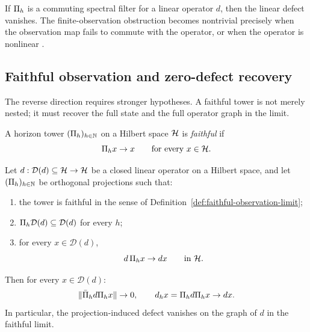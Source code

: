 \begin{remark}
\label{rem:commuting-filter-bridge}
If $\Pi_{h}$ is a commuting spectral filter for a linear operator $d$, then
the linear defect vanishes. The finite-observation obstruction becomes
nontrivial precisely when the observation map fails to commute with the
operator, or when the operator is nonlinear \cite{ReedSimon1972}.
\end{remark}

\subsection{Faithful observation and zero-defect recovery}

The reverse direction requires stronger hypotheses. A faithful tower is not
merely nested; it must recover the full state and the full operator graph in
the limit.

\begin{definition}
\label{def:faithful-observation-limit}
A horizon tower $(\Pi_{h})_{h\in\mathbb{N}}$ on a Hilbert space $\mathcal{H}$ is
\emph{faithful} if
\[
\Pi_{h}x\to x
\qquad\text{for every }x\in\mathcal{H}.
\]
\end{definition}

\begin{proposition}
\label{prop:faithful-operator-recovery}
Let $d:\mathcal D(d)\subseteq \mathcal{H}\to \mathcal{H}$ be a closed linear operator on a
Hilbert space, and let $(\Pi_{h})_{h\in\mathbb{N}}$ be orthogonal projections such
that:
\begin{enumerate}[label=(\roman*), leftmargin=2em, itemsep=0.2em]
\item the tower is faithful in the sense of
      Definition~\ref{def:faithful-observation-limit};
\item $\Pi_{h}\mathcal D(d)\subseteq \mathcal D(d)$ for every $h$;
\item for every $x\in\mathcal D(d)$,
      \[
      d\,\Pi_{h}x\to dx
      \qquad\text{in }\mathcal{H}.
      \]
\end{enumerate}
Then for every $x\in\mathcal D(d)$:
\[
\|\bar{\Pi}_{h}d\Pi_{h}x\|\to 0,
\qquad
d_{h}x=\Pi_{h}d\Pi_{h}x\to dx.
\]
In particular, the projection-induced defect vanishes on the graph of $d$ in
the faithful limit.
\end{proposition}

